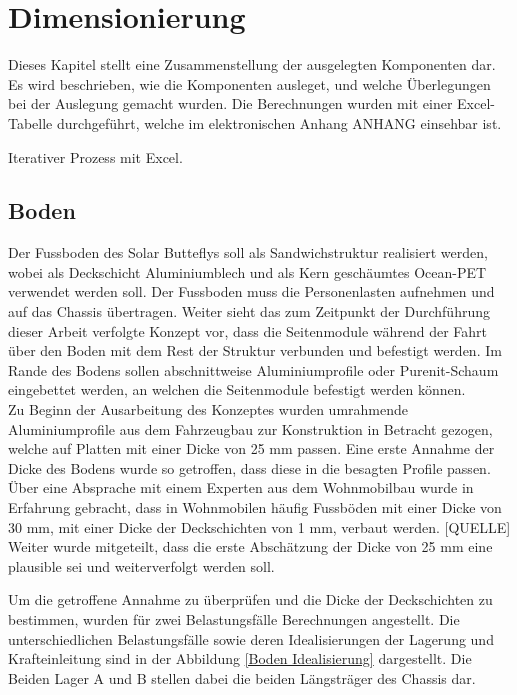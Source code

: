 \section{Dimensionierung}
Dieses Kapitel stellt eine Zusammenstellung der ausgelegten Komponenten dar. Es wird beschrieben, wie die Komponenten ausleget, und welche Überlegungen bei der Auslegung gemacht wurden. Die Berechnungen wurden mit einer Excel-Tabelle durchgeführt, welche im elektronischen Anhang ANHANG einsehbar ist.

Iterativer Prozess mit Excel.

\subsection{Boden}
\label{Boden}
Der Fussboden des Solar Butteflys soll als Sandwichstruktur realisiert werden, wobei als Deckschicht Aluminiumblech und als Kern geschäumtes Ocean-PET verwendet werden soll. Der Fussboden muss die Personenlasten aufnehmen und auf das Chassis übertragen. Weiter sieht das zum Zeitpunkt der Durchführung dieser Arbeit verfolgte Konzept vor, dass die Seitenmodule während der Fahrt über den Boden mit dem Rest der Struktur verbunden und befestigt werden. Im Rande des Bodens sollen abschnittweise Aluminiumprofile oder Purenit-Schaum eingebettet werden, an welchen die Seitenmodule befestigt werden können.\\
Zu Beginn der Ausarbeitung des Konzeptes wurden umrahmende Aluminiumprofile aus dem Fahrzeugbau zur Konstruktion in Betracht gezogen, welche auf Platten mit einer Dicke von 25 mm passen. Eine erste Annahme der Dicke des Bodens wurde so getroffen, dass diese in die besagten Profile passen. Über eine Absprache mit einem Experten aus dem Wohnmobilbau wurde in Erfahrung gebracht, dass in Wohnmobilen häufig Fussböden mit einer Dicke von 30 mm, mit einer Dicke der Deckschichten von 1 mm, verbaut werden. [QUELLE] Weiter wurde mitgeteilt, dass die erste Abschätzung der Dicke von 25 mm eine plausible sei und weiterverfolgt werden soll.

Um die getroffene Annahme zu überprüfen und die Dicke der Deckschichten zu bestimmen, wurden für zwei Belastungsfälle Berechnungen angestellt. Die unterschiedlichen Belastungsfälle sowie deren Idealisierungen der Lagerung und Krafteinleitung sind in der Abbildung \ref{Boden Idealisierung} dargestellt. Die Beiden Lager A und B stellen dabei die beiden Längsträger des Chassis dar.


